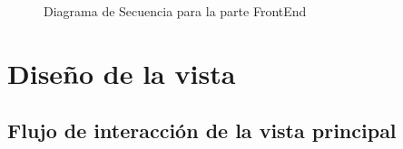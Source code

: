 \begin{figure}[H]
\caption{Diagrama de Secuencia para la parte FrontEnd}
\end{figure}

\section{Diseño de la vista}

\subsection{Flujo de interacción de la vista principal}

